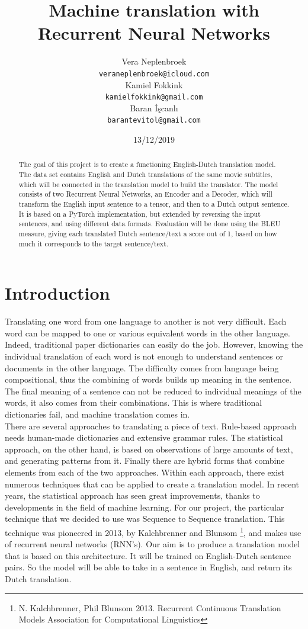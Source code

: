 \documentclass[11pt]{article}
\title{{\LARGE Machine translation with Recurrent Neural Networks}}
\author{Vera Neplenbroek \\
  {\tt veraneplenbroek@icloud.com} \\\And
  Kamiel Fokkink \\
  {\tt kamielfokkink@gmail.com} \\\And
Baran İşcanlı \\
{\tt barantevitol@gmail.com} \\}
\date{13/12/2019}
\begin{document}
\maketitle
\begin{abstract}
  The goal of this project is to create a functioning English-Dutch
  translation model. The data set contains English and Dutch
  translations of the same movie subtitles, which will be connected
  in the translation model to build the translator. The model
  consists of two Recurrent Neural Networks, an Encoder and a Decoder,
  which will transform the English input sentence to a tensor, and
  then to a Dutch output sentence. It is based on a PyTorch
  implementation, but extended by reversing the input sentences, and
  using different data formats. Evaluation will be done using the
  BLEU measure, giving each translated Dutch sentence/text a score
  out of 1, based on how much it corresponds to the target sentence/text.
\end{abstract}

\section{Introduction}

Translating one word from one language to another is not very difficult. Each word can be mapped to one or various equivalent words in the other language. Indeed, traditional paper dictionaries can easily do the job. However, knowing the individual translation of each word is not enough to understand sentences or documents in the other language. The difficulty comes from language being compositional, thus the combining of words builds up meaning in the sentence. The final meaning of a sentence can not be reduced to individual meanings of the words, it also comes from their combinations. This is where traditional dictionaries fail, and machine translation comes in.\\

There are several approaches to translating a piece of text. Rule-based approach needs human-made dictionaries and extensive grammar rules. The statistical approach, on the other hand, is based on observations of large amounts of text, and generating patterns from it. Finally there are hybrid forms that combine elements from each of the two approaches. Within each approach, there exist numerous techniques that can be applied to create a translation model. In recent years, the statistical approach has seen great improvements, thanks to developments in the field of machine learning. For our project, the particular technique that we decided to use was Sequence to Sequence translation. This technique was pioneered in 2013, by Kalchbrenner and Blunsom \footnote[1]{N. Kalchbrenner, Phil Blunsom 2013. Recurrent Continuous Translation Models Association for Computational Linguistics}, and makes use of recurrent neural networks (RNN’s). Our aim is to produce a translation model that is based on this architecture. It will be trained on English-Dutch sentence pairs. So the model will be able to take in a sentence in English, and return its Dutch translation.
\end{document}
